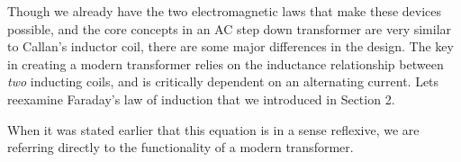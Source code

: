 \documentclass[12pt]{article}
\begin{document}
Though we already have the two electromagnetic laws that make these devices possible, and the core concepts in an AC step down transformer are very similar to Callan's inductor coil, there are some major differences in the design. The key in creating a modern transformer relies on the inductance relationship between \textit{two} inducting coils, and is critically dependent on an alternating current. Lets reexamine Faraday's law of induction that we introduced in Section 2.  

\begin{center}
	\begin{huge}
	\end{huge}
\end{center}
\vspace{5mm}	
When it was stated earlier that this equation is in a sense reflexive, we are referring directly to the functionality of a modern transformer. 
\begin{center}

\end{center}
\end{document}
